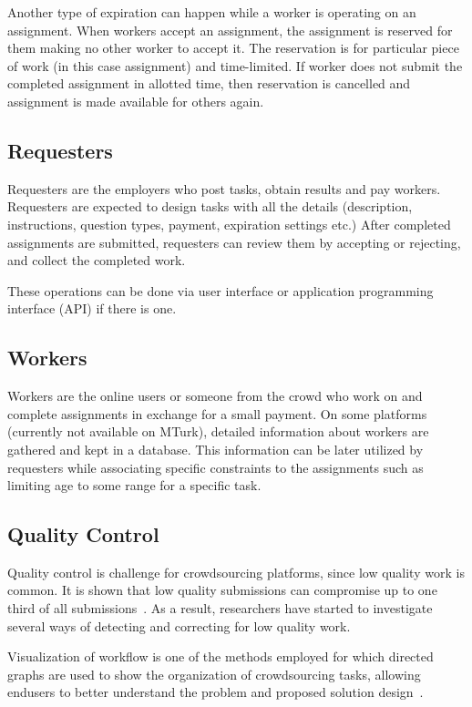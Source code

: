 Another type of expiration can happen while a worker is operating on an assignment. 
When workers accept an assignment, the assignment is reserved for them making 
no other worker to accept it. The reservation is for particular piece of work 
(in this case assignment) and time-limited. If worker does not submit the completed 
assignment in allotted time, then reservation is cancelled and assignment is 
made available for others again.

\subsection{Requesters}
Requesters are the employers who post tasks, obtain results and pay workers. 
Requesters are expected to design tasks with all the details (description, instructions, 
question types, payment, expiration settings etc.) After completed assignments 
are submitted, requesters can review them by accepting or rejecting, 
and collect the completed work. 

These operations can be done via user interface or application programming 
interface (API) if there is one. 

\subsection{Workers}
Workers are the online users or someone from the crowd who work on and 
complete assignments in exchange for a small payment. On some platforms 
(currently not available on MTurk), detailed information about workers are gathered 
and kept in a database. This information can be later utilized by requesters while 
associating specific constraints to the assignments such as limiting age to some 
range for a specific task. 

\subsection{Quality Control}
Quality control is challenge for crowdsourcing platforms, since low quality work 
is common. It is shown that low quality submissions can compromise up to one third 
of all submissions~\cite{Bernstein2010}. As a result, researchers have started to 
investigate several ways of detecting and correcting for low quality work.

Visualization of workflow is one of the methods employed for which directed graphs 
are used to show the organization of crowdsourcing tasks, allowing endusers 
to better understand the problem and proposed solution design~\cite{Kulkarni2012, Kittur2012}.

